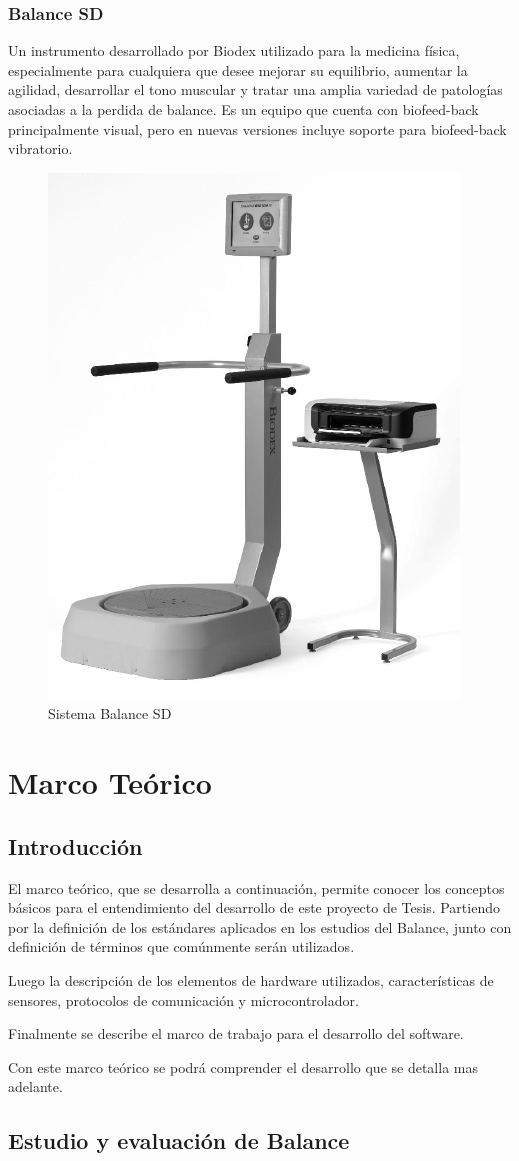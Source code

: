 \documentclass[12pt,a4paper]{article}
\begin{document}
\subsubsection{Balance SD} Un instrumento desarrollado por Biodex \cite{Biodex} utilizado para la medicina física, especialmente para cualquiera que desee mejorar su equilibrio, aumentar la agilidad, desarrollar el tono muscular y tratar una amplia variedad de patologías asociadas a la perdida de balance.
Es un equipo que cuenta con biofeed-back principalmente visual, pero en nuevas versiones incluye soporte para biofeed-back vibratorio.

\begin{figure}[H]
	\centering
	\includegraphics[width=0.25\linewidth]{images/BalanceSD}
	\caption{Sistema Balance SD}
	\label{fig:balanceSD}
\end{figure}


\section{Marco Teórico}

\subsection{Introducción}
El marco teórico, que se desarrolla a continuación, permite conocer los conceptos básicos para el entendimiento del desarrollo de este proyecto de Tesis.
Partiendo por la definición de los estándares aplicados en los estudios del Balance, junto con definición de términos que comúnmente serán utilizados.


Luego la descripción de los elementos de hardware utilizados, características de sensores, protocolos de comunicación y microcontrolador.

Finalmente se describe el marco de trabajo para el desarrollo del software.

Con este marco teórico se podrá comprender el desarrollo que se detalla mas adelante.


\subsection{Estudio y evaluación de Balance}
\end{document}
